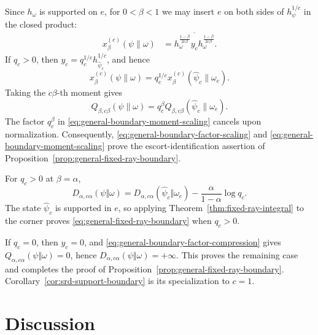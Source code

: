 \documentclass[12pt]{article}
\numberwithin{equation}{section}
\theoremstyle{definition}
\theoremstyle{remark}
\newcommand{\?}{\overset{?}{=}}
\begin{document}
Since
$h_\omega$ is supported on $e$, for $0<\beta<1$ we may insert $e$ on both
sides of $h_\psi^{1/c}$ in the closed product:
\begin{align}
  x_\beta^{(c)}(\psi\|\omega)
  &=\overline{
  h_\omega^{\frac{1-\beta}{2c\beta}}
  y_c
  h_\omega^{\frac{1-\beta}{2c\beta}}}.
  \label{eq:general-boundary-factor-compression}
\end{align}
If $q_c>0$, then
$y_c=q_c^{1/c}h_{\widehat\psi_c}^{1/c}$, and hence
\begin{equation}
  x_\beta^{(c)}(\psi\|\omega)
  =q_c^{1/c}
   x_\beta^{(c)}(\widehat\psi_c\|\omega_e).
  \label{eq:general-boundary-factor-scaling}
\end{equation}
Taking the $c\beta$-th moment gives
\begin{equation}
  Q_{\beta,c\beta}(\psi\|\omega)
  =q_c^\beta
   Q_{\beta,c\beta}(\widehat\psi_c\|\omega_e).
  \label{eq:general-boundary-moment-scaling}
\end{equation}
The factor \(q_c^\beta\) in \eqref{eq:general-boundary-moment-scaling} cancels upon normalization.
Consequently, \eqref{eq:general-boundary-factor-scaling} and \eqref{eq:general-boundary-moment-scaling} prove the escort-identification assertion
of Proposition~\ref{prop:general-fixed-ray-boundary}.  

For \(q_c>0\) at $\beta=\alpha$,
\begin{equation}
  D_{\alpha,c\alpha}(\psi\Vert\omega)
  =D_{\alpha,c\alpha}(\widehat\psi_c\Vert\omega_e)
   -\frac{\alpha}{1-\alpha}\log q_c.
\end{equation}
The state $\widehat\psi_c$ is supported in $e$, so applying
Theorem~\ref{thm:fixed-ray-integral} to the corner proves
\eqref{eq:general-fixed-ray-boundary} when \(q_c>0\).  

If $q_c=0$, then $y_c=0$, and
\eqref{eq:general-boundary-factor-compression} gives
\(Q_{\alpha,c\alpha}(\psi\Vert\omega)=0\), hence
\(D_{\alpha,c\alpha}(\psi\Vert\omega)=+\infty\).
This proves the remaining case and completes the proof of Proposition~\ref{prop:general-fixed-ray-boundary}.
Corollary~\ref{cor:srd-support-boundary} is its specialization to \(c=1\).

\section{Discussion}
\label{sec:discussion}
\end{document}
